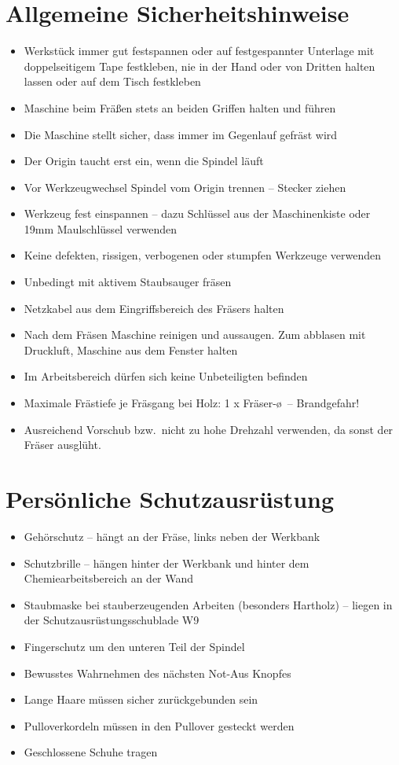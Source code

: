 \documentclass{\basedir/fablab-document}
\begin{document}
\section[Allgemeine Sicherheitshinweise]{Allgemeine Sicherheitshinweise}
\begin{itemize}
    \item Werkstück immer gut festspannen oder auf festgespannter Unterlage
        mit doppelseitigem Tape festkleben, nie in der Hand oder von Dritten
        halten lassen oder auf dem Tisch festkleben
    \item Maschine beim Fräßen stets an beiden Griffen halten und führen
    \item Die Maschine stellt sicher, dass immer im Gegenlauf gefräst wird
    \item Der Origin taucht erst ein, wenn die Spindel läuft
    \item Vor Werkzeugwechsel Spindel vom Origin trennen -- Stecker ziehen
    \item Werkzeug fest einspannen -- dazu Schlüssel aus der Maschinenkiste oder
        19mm Maulschlüssel verwenden
    \item Keine defekten, rissigen, verbogenen oder stumpfen Werkzeuge verwenden
    \item Unbedingt mit aktivem Staubsauger fräsen
    \item Netzkabel aus dem Eingriffsbereich des Fräsers halten
    \item Nach dem Fräsen Maschine reinigen und aussaugen. Zum abblasen mit Druckluft,
        Maschine aus dem Fenster halten
    \item Im Arbeitsbereich dürfen sich keine Unbeteiligten befinden
    \item Maximale Frästiefe je Fräsgang bei Holz: 1 x Fräser-\o\ -- Brandgefahr!
    \item Ausreichend Vorschub bzw.\ nicht zu hohe Drehzahl verwenden, da sonst
        der Fräser ausglüht.
\end{itemize}


\section{Persönliche Schutzausrüstung}
\begin{itemize}
    \item Gehörschutz -- hängt an der Fräse, links neben der Werkbank
    \item Schutzbrille -- hängen hinter der Werkbank und hinter dem
        Chemiearbeitsbereich an der Wand
    \item Staubmaske bei stauberzeugenden Arbeiten (besonders
        Hartholz) -- liegen in der Schutzausrüstungsschublade W9
    \item Fingerschutz um den unteren Teil der Spindel
    \item Bewusstes Wahrnehmen des nächsten Not-Aus Knopfes
    \item Lange Haare müssen sicher zurückgebunden sein
    \item Pulloverkordeln müssen in den Pullover gesteckt werden
    \item Geschlossene Schuhe tragen
\end{itemize}
\end{document}
